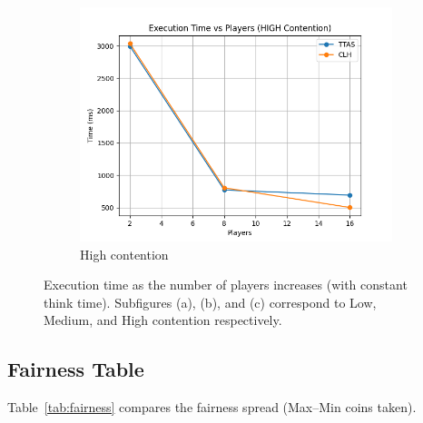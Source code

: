 \documentclass[12pt,a4paper]{article}
\begin{document}
\begin{figure}[H]
  \vspace{0.5em}
  \begin{subfigure}{0.65\textwidth}
    \centering
    \includegraphics[width=\linewidth]{const_plot_time_HIGH.png}
    \caption{High contention}
    \label{fig:const-time-high}
  \end{subfigure}
  
    \caption{Execution time as the number of players increases (with constant think time). Subfigures (a), (b), and (c) correspond to Low, Medium, and High contention respectively.}
  \label{fig:execution-time-const}
\end{figure}

\clearpage
\subsection{Fairness Table}
Table~\ref{tab:fairness} compares the fairness spread (Max--Min coins taken).
\end{document}
